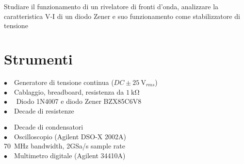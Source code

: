 Studiare il funzionamento di un rivelatore di fronti d'onda, analizzare la caratteristica V-I di un diodo Zener e suo funzionamento come stabilizzatore di tensione

\section{Strumenti}
%
\phantom{porcodio!}
\noindent
\begin{minipage}{.5\linewidth}
$\bullet \quad$Generatore di tensione continua ($DC \pm \SI{25}{\volt}_{rms}$)\\
$\bullet \quad$Cablaggio, breadboard, resistenza da $\SI{1}{\kilo\ohm}$\\
$\bullet \quad$ Diodo 1N4007 e diodo Zener BZX85C6V8\\
$\bullet \quad$Decade di resistenze
\end{minipage}%
\begin{minipage}{.5\linewidth}
$\bullet \quad$Decade di condensatori\\
$\bullet \quad$Oscilloscopio (Agilent DSO-X 2002A)\\
\phantom{xxxx}\SI{70}{\mega\hertz} bandwidth, 2GSa/s sample rate\\
$\bullet \quad$Multimetro digitale (Agilent 34410A)\\
\end{minipage}
